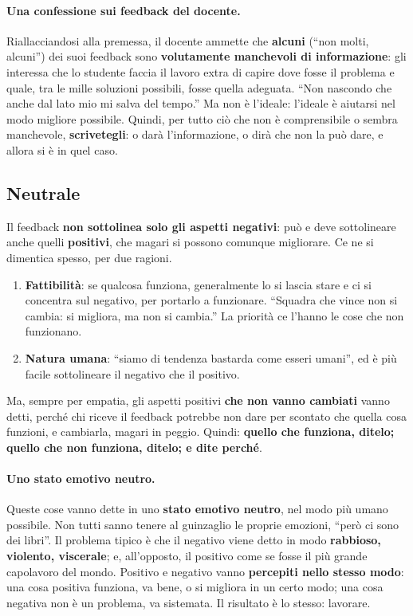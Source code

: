 \paragraph{Una confessione sui feedback del docente.} Riallacciandosi alla
premessa, il docente ammette che \textbf{alcuni} (``non molti, alcuni'') dei
suoi feedback sono \textbf{volutamente manchevoli di informazione}: gli
interessa che lo studente faccia il lavoro extra di capire dove fosse il
problema e quale, tra le mille soluzioni possibili, fosse quella adeguata.
``Non nascondo che anche dal lato mio mi salva del tempo.'' Ma non è
l'ideale: l'ideale è aiutarsi nel modo migliore possibile. Quindi, per tutto
ciò che non è comprensibile o sembra manchevole, \textbf{scrivetegli}: o
darà l'informazione, o dirà che non la può dare, e allora si è in quel caso.

\subsection{Neutrale}

Il feedback \textbf{non sottolinea solo gli aspetti negativi}: può e deve
sottolineare anche quelli \textbf{positivi}, che magari si possono comunque
migliorare. Ce ne si dimentica spesso, per due ragioni.
\begin{enumerate}
  \item \textbf{Fattibilità}: se qualcosa funziona, generalmente lo si lascia
        stare e ci si concentra sul negativo, per portarlo a funzionare.
        ``Squadra che vince non si cambia: si migliora, ma non si cambia.''
        La priorità ce l'hanno le cose che non funzionano.
  \item \textbf{Natura umana}: ``siamo di tendenza bastarda come esseri
        umani'', ed è più facile sottolineare il negativo che il positivo.
\end{enumerate}
Ma, sempre per empatia, gli aspetti positivi \textbf{che non vanno
cambiati} vanno detti, perché chi riceve il feedback potrebbe non dare per
scontato che quella cosa funzioni, e cambiarla, magari in peggio. Quindi:
\textbf{quello che funziona, ditelo; quello che non funziona, ditelo; e dite
perché}.

\paragraph{Uno stato emotivo neutro.} Queste cose vanno dette in uno
\textbf{stato emotivo neutro}, nel modo più umano possibile. Non tutti
sanno tenere al guinzaglio le proprie emozioni, ``però ci sono dei libri''.
Il problema tipico è che il negativo viene detto in modo \textbf{rabbioso,
violento, viscerale}; e, all'opposto, il positivo come se fosse il più
grande capolavoro del mondo. Positivo e negativo vanno \textbf{percepiti
nello stesso modo}: una cosa positiva funziona, va bene, o si migliora in un
certo modo; una cosa negativa non è un problema, va sistemata. Il risultato
è lo stesso: lavorare.

